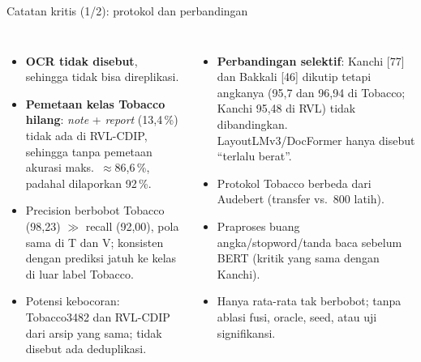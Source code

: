 \documentclass[aspectratio=169,10pt]{beamer}
\newcommand\kecil{\fontsize{8}{9.5}\selectfont}
\newcommand\awas[1]{\textcolor{merah}{\textbf{#1}}}
\begin{document}
\begin{frame}{Catatan kritis (1/2): protokol dan perbandingan}
  \begin{columns}[T]
    \begin{itemize}\kecil
      \item \awas{OCR tidak disebut}, sehingga tidak bisa direplikasi.
      \item \awas{Pemetaan kelas Tobacco hilang}: \emph{note} + \emph{report} (13,4\,\%) tidak ada di RVL-CDIP, sehingga tanpa pemetaan akurasi maks.\ $\approx$86,6\,\%, padahal dilaporkan 92\,\%.
      \item Precision berbobot Tobacco (98,23) $\gg$ recall (92,00), pola sama di T dan V; konsisten dengan prediksi jatuh ke kelas di luar label Tobacco.
      \item Potensi kebocoran: Tobacco3482 dan RVL-CDIP dari arsip yang sama; tidak disebut ada deduplikasi.
    \end{itemize}
    \begin{itemize}\kecil
      \item \awas{Perbandingan selektif}: Kanchi [77] dan Bakkali [46] dikutip tetapi angkanya (95,7 dan 96,94 di Tobacco; Kanchi 95,48 di RVL) tidak dibandingkan. LayoutLMv3/DocFormer hanya disebut ``terlalu berat''.
      \item Protokol Tobacco berbeda dari Audebert (transfer vs.\ 800 latih).
      \item Praproses buang angka/stopword/tanda baca sebelum BERT (kritik yang sama dengan Kanchi).
      \item Hanya rata-rata tak berbobot; tanpa ablasi fusi, oracle, seed, atau uji signifikansi.
    \end{itemize}
  \end{columns}
\end{frame}
\end{document}
